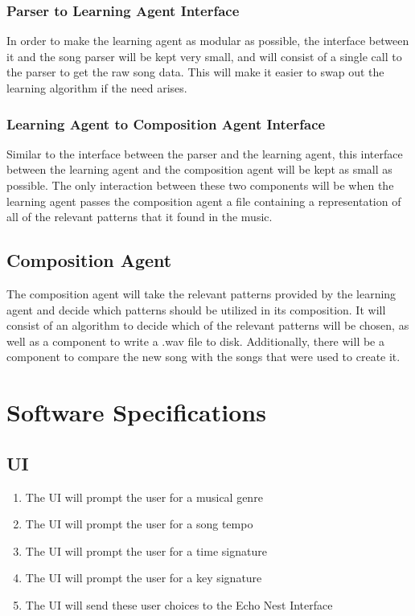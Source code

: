 \documentclass{article}
\begin{document}
\subsubsection{Parser to Learning Agent Interface}
In order to make the learning agent as modular as possible, the interface between it and the song parser will be kept very small, and will consist of a single call to the parser to get the raw song data. This will make it easier to swap out the learning algorithm if the need arises.

\subsubsection{Learning Agent to Composition Agent Interface}
Similar to the interface between the parser and the learning agent, this interface between the learning agent and the composition agent will be kept as small as possible. The only interaction between these two components will be when the learning agent passes the composition agent a file containing a representation of all of the relevant patterns that it found in the music.

\subsection{Composition Agent}
The composition agent will take the relevant patterns provided by the learning agent and decide which patterns should be utilized in its composition. It will consist of an algorithm to decide which of the relevant patterns will be chosen, as well as a component to write a .wav file to disk.  Additionally, there will be a component to compare the new song with the songs that were used to create it.

\section{Software Specifications}
\subsection{UI}
\begin{enumerate}
\item The UI will prompt the user for a musical genre
\item The UI will prompt the user for a song tempo
\item The UI will prompt the user for a time signature
\item The UI will prompt the user for a key signature
\item The UI will send these user choices to the Echo Nest Interface
\end{enumerate}
\end{document}
